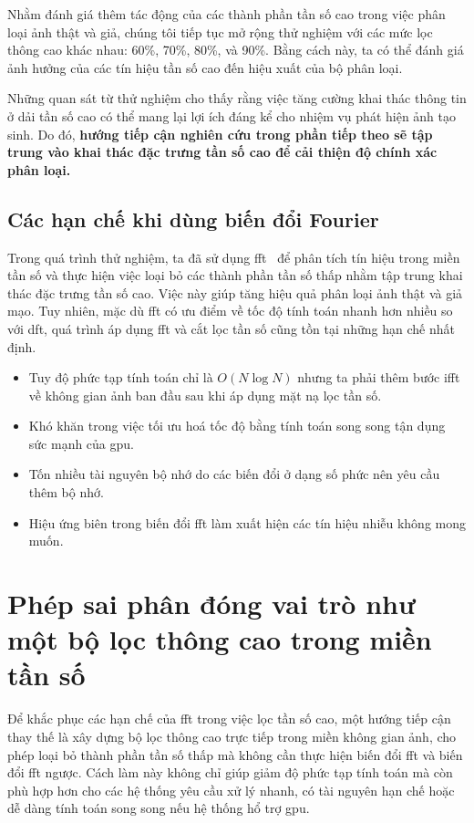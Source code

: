 Nhằm đánh giá thêm tác động của các thành phần tần số cao trong việc phân loại ảnh thật và giả, chúng tôi tiếp tục mở rộng thử nghiệm với các mức lọc thông cao khác nhau: 60\%, 70\%, 80\%, và 90\%. Bằng cách này, ta có thể đánh giá ảnh hưởng của các tín hiệu tần số cao đến hiệu xuất của bộ phân loại.

Những quan sát từ thử nghiệm cho thấy rằng việc tăng cường khai thác thông tin ở dải tần số cao có thể mang lại lợi ích đáng kể cho nhiệm vụ phát hiện ảnh tạo sinh. Do đó, \textbf{hướng tiếp cận nghiên cứu trong phần tiếp theo sẽ tập trung vào khai thác đặc trưng tần số cao để cải thiện độ chính xác phân loại.}

\subsection{Các hạn chế khi dùng biến đổi Fourier}

Trong quá trình thử nghiệm, ta đã sử dụng \gls{fft}~\cite{Arunachalam2013TheFF} để phân tích tín hiệu trong miền tần số và thực hiện việc loại bỏ các thành phần tần số thấp nhằm tập trung khai thác đặc trưng tần số cao. Việc này giúp tăng hiệu quả phân loại ảnh thật và giả mạo. Tuy nhiên, mặc dù \gls{fft} có ưu điểm về tốc độ tính toán nhanh hơn nhiều so với \gls{dft}, quá trình áp dụng \gls{fft} và cắt lọc tần số cũng tồn tại những hạn chế nhất định.

\begin{itemize}
	\item Tuy độ phức tạp tính toán chỉ là $O(N\log{N})$ nhưng ta phải thêm bước \gls{ifft} về không gian ảnh ban đầu sau khi áp dụng mặt nạ lọc tần số.
	\item Khó khăn trong việc tối ưu hoá tốc độ bằng tính toán song song tận dụng sức mạnh của \gls{gpu}.
	\item Tốn nhiều tài nguyên bộ nhớ do các biến đổi ở dạng số phức nên yêu cầu thêm bộ nhớ.
	\item Hiệu ứng biên trong biến đổi \gls{fft} làm xuất hiện các tín hiệu nhiễu không mong muốn.
\end{itemize}

\section{Phép sai phân đóng vai trò như một bộ lọc thông cao trong miền tần số}

Để khắc phục các hạn chế của \gls{fft} trong việc lọc tần số cao, một hướng tiếp cận thay thế là xây dựng bộ lọc thông cao trực tiếp trong miền không gian ảnh, cho phép loại bỏ thành phần tần số thấp mà không cần thực hiện biến đổi \gls{fft} và biến đổi \gls{fft} ngược.
%
Cách làm này không chỉ giúp giảm độ phức tạp tính toán mà còn phù hợp hơn cho các hệ thống yêu cầu xử lý nhanh, có tài nguyên hạn chế hoặc dễ dàng tính toán song song nếu hệ thống hổ trợ \gls{gpu}.

